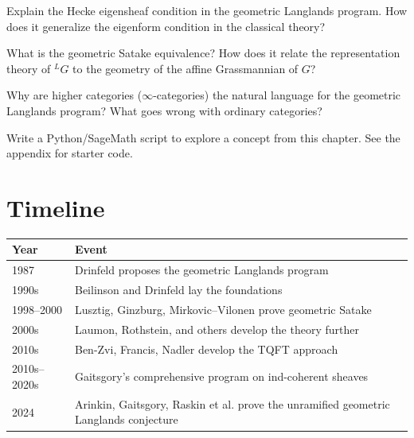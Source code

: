 \begin{exercise}[Intermediate]
Explain the Hecke eigensheaf condition in the geometric Langlands program. How does it generalize the eigenform condition in the classical theory?
\end{exercise}

\begin{exercise}[Challenge]
What is the geometric Satake equivalence? How does it relate the representation theory of $^LG$ to the geometry of the affine Grassmannian of $G$? \cite{mirkovic2007}
\end{exercise}

\begin{exercise}
Why are higher categories ($\infty$-categories) the natural language for the geometric Langlands program? What goes wrong with ordinary categories?
\end{exercise}


\begin{exercise}[Computational]
Write a Python/SageMath script to explore a concept from this chapter. See the appendix for starter code.
\end{exercise}

\section{Timeline}

\begin{tabularx}{\linewidth}{lX}
\toprule
\textbf{Year} & \textbf{Event} \\ \midrule
1987 & Drinfeld proposes the geometric Langlands program \cite{drinfeld1987} \\ 
1990s & Beilinson and Drinfeld lay the foundations \cite{beilinson2004} \\ 
1998--2000 & Lusztig, Ginzburg, Mirkovic--Vilonen prove geometric Satake \cite{mirkovic2007} \\
2000s & Laumon, Rothstein, and others develop the theory further \\ 
2010s & Ben-Zvi, Francis, Nadler develop the TQFT approach \cite{benzvi2014} \\ 
2010s--2020s & Gaitsgory's comprehensive program on ind-coherent sheaves \cite{gaitsgory2009} \\ 
2024 & Arinkin, Gaitsgory, Raskin et al. prove the unramified geometric Langlands conjecture \cite{arinkin2024} \\ \bottomrule
\end{tabularx}

